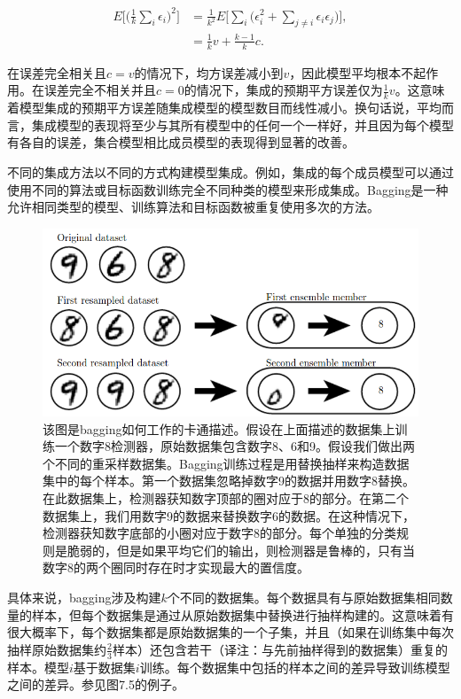 $$
\begin{aligned}
E \Bigg[\Bigg(\frac{1}{k} \sum_i \epsilon_i \Bigg)^2\Bigg]
& = \frac{1}{k^2} E \Bigg[\sum_i \Bigg(\epsilon_i^2 + \sum_{j \neq i} \epsilon_i \epsilon_j\Bigg)\Bigg], \\
& = \frac{1}{k} v + \frac{k-1}{k} c .
\end{aligned}
$$

在误差完全相关且$c = v$的情况下，均方误差减小到$v$，因此模型平均根本不起作用。在误差完全不相关并且$c = 0$的情况下，集成的预期平方误差仅为$\frac{1}{k}v$。这意味着模型集成的预期平方误差随集成模型的模型数目而线性减小。换句话说，平均而言，集成模型的表现将至少与其所有模型中的任何一个一样好，并且因为每个模型有各自的误差，集合模型相比成员模型的表现得到显著的改善。

不同的集成方法以不同的方式构建模型集成。例如，集成的每个成员模型可以通过使用不同的算法或目标函数训练完全不同种类的模型来形成集成。Bagging是一种允许相同类型的模型、训练算法和目标函数被重复使用多次的方法。

\begin{figure}[htbp] %
   \centering
   \includegraphics[width=5in]{fig/chap7/7_5.png} 
   \caption{该图是bagging如何工作的卡通描述。假设在上面描述的数据集上训练一个数字8检测器，原始数据集包含数字8、6和9。假设我们做出两个不同的重采样数据集。Bagging训练过程是用替换抽样来构造数据集中的每个样本。第一个数据集忽略掉数字9的数据并用数字8替换。在此数据集上，检测器获知数字顶部的圈对应于8的部分。在第二个数据集上，我们用数字9的数据来替换数字6的数据。在这种情况下，检测器获知数字底部的小圈对应于数字8的部分。每个单独的分类规则是脆弱的，但是如果平均它们的输出，则检测器是鲁棒的，只有当数字8的两个圈同时存在时才实现最大的置信度。}
   \label{fig:7_5}
\end{figure}

具体来说，bagging涉及构建$k$个不同的数据集。每个数据具有与原始数据集相同数量的样本，但每个数据集是通过从原始数据集中替换进行抽样构建的。这意味着有很大概率下，每个数据集都是原始数据集的一个子集，并且（如果在训练集中每次抽样原始数据集约$\frac{2}{3}$样本）还包含若干（译注：与先前抽样得到的数据集）重复的样本。模型$i$基于数据集$i$训练。每个数据集中包括的样本之间的差异导致训练模型之间的差异。参见图7.5的例子。

